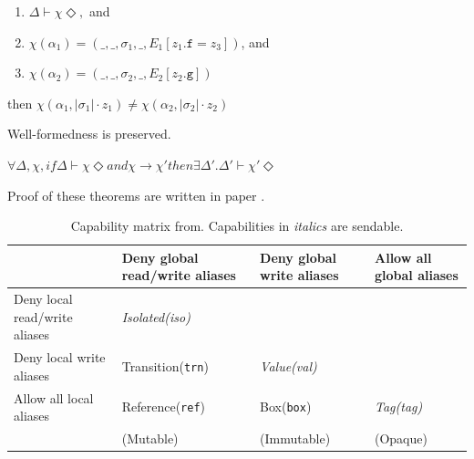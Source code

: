 \documentclass{article}
\begin{document}
\begin{multicols}{2}
\begin{theorem}
	\begin{enumerate}
		\item $\Delta \vdash \chi \Diamond,$ and
		\item $\chi(\alpha_1) = (\_,\_,\sigma_1, \_,  E_1[z_1.\texttt{f} = z_3])$, and
		\item $\chi(\alpha_2) = (\_,\_,\sigma_2, \_,  E_2[z_2.\texttt{g}])$
	\end{enumerate} 
	
	then $\chi(\alpha_1, |\sigma_1|\cdot z_1) \neq \chi(\alpha_2, |\sigma_2| \cdot z_2)$
\end{theorem}

\begin{theorem} 
	Well-formedness is preserved.
	
	$\forall \Delta, \chi, if \Delta \vdash \chi \Diamond and \chi \rightarrow \chi' then  \exists \Delta'.\Delta' \vdash \chi'\Diamond$
\end{theorem}

Proof of these theorems are written in paper \cite{type-proof-paper}.


\begin{table}[]
\begin{tabularx}{\textwidth}{|X|X|X|X|}
 \hline
 & Deny global read/write aliases & Deny global write aliases & Allow all global aliases \\  \hline
Deny local read/write aliases & \textit{Isolated(iso) }    &                           &                        \\  \hline
Deny local write aliases      & Transition(\texttt{trn})                & \textit{Value(val)  }              &                        \\  \hline
Allow all local aliases       & Reference(\texttt{ref})                 & Box(\texttt{box})                  & \textit{Tag(tag)  }             \\  \hline
                              & (Mutable)                      & (Immutable)               & (Opaque)   \\ \hline           
\end{tabularx}
\caption{Capability matrix from\cite{type-proof-paper}. Capabilities in \textit{italics} are sendable.}
\end{table}


\end{multicols}
\end{document}
